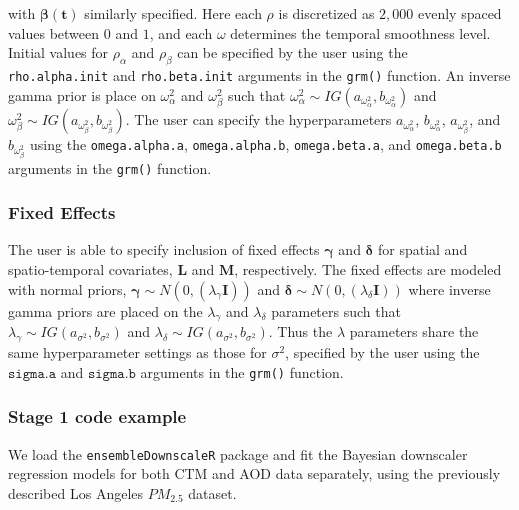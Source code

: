 \documentclass[12pt]{article}
\newcommand{\bs}{\boldsymbol}
\newcommand{\bl}{\mathbf}
\begin{document}
with $\bs{\beta}(\bl{t})$ similarly specified. 
Here each $\rho$ is discretized as $2,000$ evenly spaced values between $0$ and $1$, and each $\omega$ determines the temporal smoothness level. 
Initial values for $\rho_{\alpha}$ and $\rho_{\beta}$ can be specified by the user using the \texttt{rho.alpha.init} and \texttt{rho.beta.init} arguments in the \texttt{grm()} function.
An inverse gamma prior is place on $\omega^2_{\alpha}$ and $\omega^2_{\beta}$ such that $\omega^2_{\alpha} \sim IG(a_{\omega_{\alpha}^2}, b_{\omega_{\alpha}^2})$ and $\omega^2_{\beta} \sim IG(a_{\omega_{\beta}^2}, b_{\omega_{\beta}^2})$.
The user can specify the hyperparameters $a_{\omega_{\alpha}^2}$, $b_{\omega_{\alpha}^2}$, $a_{\omega_{\beta}^2}$, and $b_{\omega_{\beta}^2}$ using the \texttt{omega.alpha.a}, \texttt{omega.alpha.b}, \texttt{omega.beta.a}, and \texttt{omega.beta.b} arguments in the \texttt{grm()} function.

\subsubsection*{Fixed Effects}

The user is able to specify inclusion of fixed effects $\mathbf{\gamma}$ and $\mathbf{\delta}$ for spatial and spatio-temporal covariates, $\bl{L}$ and $\bl{M}$, respectively. 
The fixed effects are modeled with normal priors, $\bs{\gamma} \sim N(0, (\lambda_{\gamma}\bs{I}))$ and $\bs{\delta} \sim N(0, (\lambda_{\delta}\bs{I}))$ where inverse gamma priors are placed on the $\lambda_{\gamma}$ and $\lambda_{\delta}$ parameters such that $\lambda_{\gamma} \sim IG(a_{\sigma^2}, b_{\sigma^2})$ and $\lambda_{\delta} \sim IG(a_{\sigma^2}, b_{\sigma^2})$.
Thus the $\lambda$ parameters share the same hyperparameter settings as those for $\sigma^2$, specified by the user using the $\texttt{sigma.a}$ and $\texttt{sigma.b}$ arguments in the \texttt{grm()} function.


\subsubsection*{Stage 1 code example}

We load the \texttt{ensembleDownscaleR} package and fit the Bayesian downscaler regression models for both CTM and AOD data separately, using the previously described Los Angeles $PM_{2.5}$ dataset.
\end{document}
